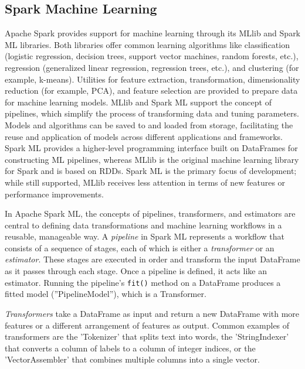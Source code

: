 \begin{advanced}
\subsection{Spark Machine Learning}

Apache Spark provides support for machine learning through its MLlib and Spark ML libraries. Both libraries offer common learning algorithms like classification (logistic regression, decision trees, support vector machines, random forests, etc.), regression (generalized linear regression, regression trees, etc.), and clustering (for example, k-means). Utilities for feature extraction, transformation, dimensionality reduction (for example, PCA), and feature selection are provided to prepare data for machine learning models. MLlib and Spark ML support the concept of pipelines, which simplify the process of transforming data and tuning parameters. Models and algorithms can be saved to and loaded from storage, facilitating the reuse and application of models across different applications and frameworks. Spark ML provides a higher-level programming interface built on DataFrames for constructing ML pipelines, whereas MLlib is the original machine learning library for Spark and is based on RDDs. Spark ML is the primary focus of development; while still supported, MLlib receives less attention in terms of new features or performance improvements.

In Apache Spark ML, the concepts of pipelines, transformers, and estimators are central to defining data transformations and machine learning workflows in a reusable, manageable way. A \emph{pipeline} in Spark ML represents a workflow that consists of a sequence of stages, each of which is either a \emph{transformer} or an \emph{estimator}. These stages are executed in order and transform the input DataFrame as it passes through each stage. Once a pipeline is defined, it acts like an estimator. Running the pipeline's \texttt{fit()} method on a DataFrame produces a fitted model (''PipelineModel''), which is a Transformer.

\emph{Transformers} take a DataFrame as input and return a new DataFrame with more features or a different arrangement of features as output. Common examples of transformers are the 'Tokenizer' that splits text into words, the 'StringIndexer' that converts a column of labels to a column of integer indices, or the 'VectorAssembler' that combines multiple columns into a single vector.


\end{advanced}
